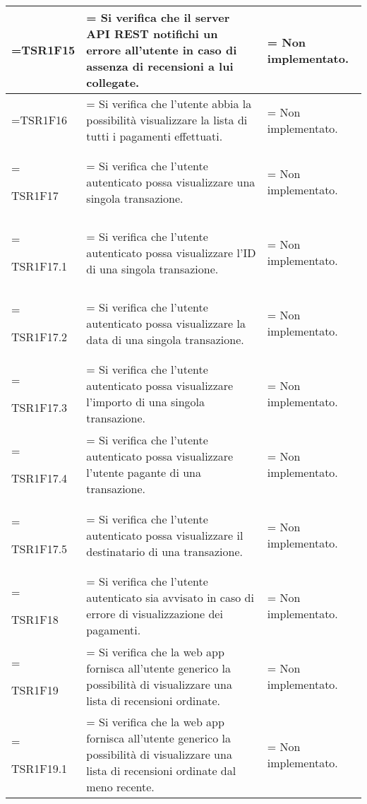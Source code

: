 \begin{xltabular}{\textwidth} {
            >{\hsize\linewidth=\hsize}X
            >{\hsize\linewidth=\hsize}X
            >{\hsize\linewidth=\hsize}X
        }
        TSR1F15 &
        Si verifica che il server API REST notifichi un errore all'utente in caso di assenza di recensioni a lui collegate. &
        Non implementato.
        \\ \hline


        TSR1F16 &
        Si verifica che l'utente abbia la possibilità visualizzare la lista di tutti i pagamenti
        effettuati. &
        Non implementato.
        \\ \hline

        TSR1F17 &
        Si verifica che l'utente autenticato possa visualizzare una singola transazione. &
        Non implementato.
        \\ \hline

        TSR1F17.1 &
        Si verifica che l'utente autenticato possa visualizzare l'ID di una singola transazione. &
        Non implementato.
        \\ \hline


        TSR1F17.2 &
        Si verifica che l'utente autenticato possa visualizzare la data di una singola transazione. &
        Non implementato.
        \\ \hline

        TSR1F17.3 &
        Si verifica che l'utente autenticato possa visualizzare l'importo di una singola transazione. &
        Non implementato.
        \\ \hline

        TSR1F17.4 &
        Si verifica che l'utente autenticato possa visualizzare l'utente pagante di una transazione. &
        Non implementato.
        \\ \hline

        TSR1F17.5 &
        Si verifica che l'utente autenticato possa visualizzare il destinatario di una transazione. &
        Non implementato.
        \\ \hline

        TSR1F18 &
        Si verifica che l'utente autenticato sia avvisato in caso di errore di visualizzazione dei pagamenti. &
        Non implementato.
        \\ \hline

        TSR1F19 &
        Si verifica che la web app fornisca all'utente generico la possibilità di visualizzare una lista di recensioni ordinate. &
        Non implementato. 
        \\ \hline

        TSR1F19.1 &
        Si verifica che la web app fornisca all'utente generico la possibilità di visualizzare una lista di recensioni ordinate dal meno recente. &
        Non implementato. 
        \\ \hline


\end{xltabular}
